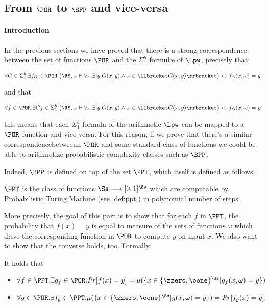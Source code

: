 \begin{conditional}{\notappendix}
  \section{From $\POR$ to $\SFP$ and vice-versa}
  \paragraph{Introduction}
  \label{par:introduction}
  In the previous sections we have proved that
  there is a strong correspondence between the
  set of functions $\POR$ and the $\Sigma^b_1$
  formul\ae{} of $\Lpw$, precisely that:

  \[
  \forall G \in \Sigma^b_1. \exists f_G \in \POR. \big(\RS, \omega \vdash \forall x. \exists ! y. G(x, y) \land \omega \in \llbracket G(x, y) \rrbracket\big)  \leftrightarrow f_G(x, \omega) = y
  \]

  and that

  \[
  \forall f \in \POR.\exists G_f \in \Sigma^b_1. \big(\RS, \omega \vdash \forall x. \exists ! y. G(x, y) \land \omega \in \llbracket G(x, y) \rrbracket\big) \leftrightarrow f_G(x, \omega) = y
  \]


   this means that each $\Sigma^b_1$ formula of the arithmetic $\Lpw$
   can be mapped to a $\POR$ function and vice-versa. For this reason,
   if we prove that there's a similar correspondencebetweenn $\POR$
   and some standard class of functions we could be able to arithmetize
   probabilistic complexity classes such as $\BPP$.

   Indeed, $\BPP$ is defined on top of the set $\PPT$, which itself is
   defined as follows:

   \begin{defn}[$\PPT$]
     $\PPT$ is the class of functions $\Ss \longrightarrow [0, 1]^\Ss$ which
      are computable by Probabilistic Turing Machine (see \ref{def:ppt}) in
      polynomial number of steps.
   \end{defn}

   More precisely, the goal of this part is to show that
   for each $f$ in $\PPT$, the probability
   that $f(x)=y$ is equal to  measure of the sets of functions $\omega$
   which drive the corresponding function in $\POR$ to compute $y$
   on input $x$. We also want to show that the converse holds, too.
   Formally:

  \begin{conj}
    \label{conj:taskc}
    It holds that
    \begin{itemize}
      \item $\forall f\in \PPT. \exists g_f \in \POR. \mathit{Pr}[f(x)=y]=
      \mu(\{x \in \{\zzero, \oone\}^\Ss | g_f(x, \omega)=y\})$
      \item $\forall g \in \POR. \exists f_g \in \PPT.
       \mu(\{x \in \{\zzero, \oone\}^\Ss | g(x, \omega)=y\})=\mathit{Pr}[f_g(x)=y]$
    \end{itemize}
  \end{conj}

\end{conditional}
